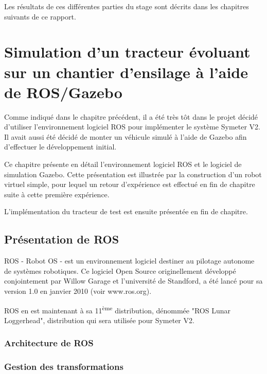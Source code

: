 \documentclass[12pt,a4paper]{report}
\begin{document}
	\para Les résultats de ces différentes parties du stage sont décrits dans les chapitres suivants de ce rapport.
	
				

\chapter{Simulation d'un tracteur évoluant sur un chantier d'ensilage à l'aide de ROS/Gazebo}
\label{chap-simu-ros-gazebo}

Comme indiqué dans le chapitre précédent, il a été très tôt dans le projet décidé d'utiliser l'environnement logiciel ROS pour implémenter le système Symeter V2. Il avait aussi été décidé de monter un véhicule simulé à l'aide de Gazebo afin d'effectuer le développement initial.

\para Ce chapitre présente en détail l'environnement logiciel ROS et le logiciel de simulation Gazebo. Cette présentation est illustrée par la construction d'un robot virtuel simple, pour lequel un retour d'expérience est effectué en fin de chapitre suite à cette première expérience.

\para L'implémentation du tracteur de test est ensuite présentée en fin de chapitre.

	\section{Présentation de ROS}
	
	ROS - Robot OS - est un environnement logiciel destiner au pilotage autonome de systèmes robotiques. Ce logiciel Open Source originellement développé conjointement par Willow Garage et l'université de Standford, a été lancé pour sa version 1.0 en janvier 2010 (voir www.ros.org).
	
	\para ROS en est maintenant à sa 11\textsuperscript{ème} distribution, dénommée "ROS Lunar Loggerhead", distribution qui sera utilisée pour Symeter V2.
	
		\subsection{Architecture de ROS}
		\subsection{Gestion des transformations}
\end{document}
